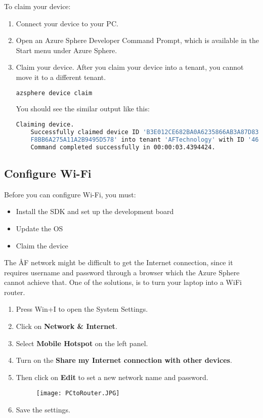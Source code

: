 To claim your device:
\begin{enumerate}
    \item Connect your device to your PC.
    \item Open an Azure Sphere Developer Command Prompt, which is available in the Start menu under Azure Sphere.
    \item Claim your device. After you claim your device into a tenant, you cannot move it to a different tenant.
    \begin{lstlisting}[language=bash]
    azsphere device claim
    \end{lstlisting}
    You should see the similar output like this:
    \begin{lstlisting}[language=bash]
    Claiming device.
    Successfully claimed device ID 'B3E012CE682BA0A6235866AB3A87D838A4817E5C539832A34BF7A715CA8D015FF99C84B909CB2886916259AD186B212E148FC9C4B
    F8BB6A275A11A2B9495D578' into tenant 'AFTechnology' with ID '4679af44-ad27-4c1d-9ef8-4f76b540edae'. 
    Command completed successfully in 00:00:03.4394424.
    \end{lstlisting}
\end{enumerate}

\newpage

\subsection{Configure Wi-Fi}
Before you can configure Wi-Fi, you must:
\begin{itemize}
    \item Install the SDK and set up the development board
    \item Update the OS
    \item Claim the device
\end{itemize}

The ÅF network might be difficult to get the Internet connection, since it requires username and password through a browser which the Azure Sphere 
cannot achieve that. One of the solutions, is to turn your laptop into a WiFi router. 
\begin{enumerate}
    \item Press Win+I to open the System Settings.
    \item Click on \textbf{Network \& Internet}.
    \item Select \textbf{Mobile Hotspot} on the left panel.
    \item Turn on the \textbf{Share my Internet connection with other devices}.
    \item Then click on \textbf{Edit} to set a new network name and password. 
    \begin{figure}[h]
        \texttt{[image: PCtoRouter.JPG]}
    \end{figure}
    \item Save the settings.
\end{enumerate}

